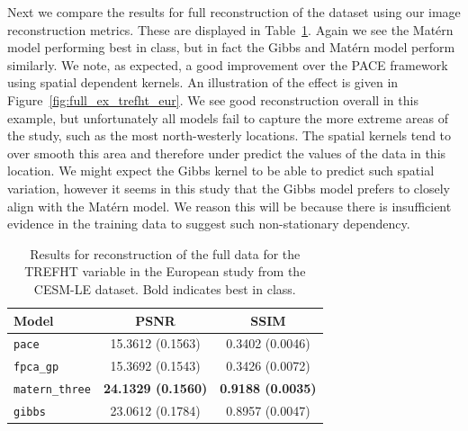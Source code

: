 Next we compare the results for full reconstruction of the dataset using our image reconstruction metrics.
These are displayed in Table~\ref{tab:full_cesm_trefht_eur}.
Again we see the Mat\'ern model performing best in class, but in fact the Gibbs and Mat\'ern model perform similarly.
We note, as expected, a good improvement over the PACE framework using spatial dependent kernels.
An illustration of the effect is given in Figure~\ref{fig:full_ex_trefht_eur}.
We see good reconstruction overall in this example, but unfortunately all models fail to capture the more extreme areas of the study, such as the most north-westerly locations.
The spatial kernels tend to over smooth this area and therefore under predict the values of the data in this location.
We might expect the Gibbs kernel to be able to predict such spatial variation, however it seems in this study that the Gibbs model prefers to closely align with the Mat\'ern model.
We reason this will be because there is insufficient evidence in the training data to suggest such non-stationary dependency. 

\begin{table}
	\caption[Results for TREFHT variable on full data in the European study]{Results for reconstruction of the full data for the TREFHT variable in the European study from the CESM-LE dataset. Bold indicates best in class.}
	\centering
	\label{tab:full_cesm_trefht_eur}
	\begin{tabular}{lcc}
		\toprule
		\textbf{Model} & \textbf{PSNR} & \textbf{SSIM} \\
		\midrule
		\verb*|pace| & 15.3612	(0.1563)& 0.3402 (0.0046) \\
		\verb*|fpca_gp| & 15.3692 (0.1543)& 0.3426	(0.0072) \\
		\verb*|matern_three| & \textbf{24.1329	(0.1560)}& \textbf{0.9188 (0.0035)}\\
		\verb*|gibbs| & 23.0612	(0.1784) & 0.8957 (0.0047)\\
		\bottomrule
	\end{tabular}
\end{table}

